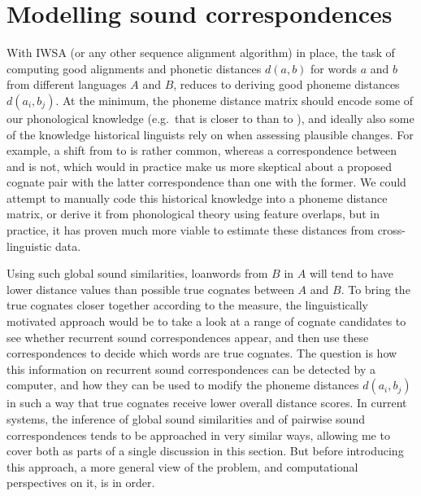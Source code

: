 \section{Modelling sound correspondences}
With IWSA (or any other sequence alignment algorithm) in place, the task of computing good alignments and phonetic distances $d(a,b)$ for words $a$ and $b$ from different languages $A$ and $B$, reduces to deriving good phoneme distances $d(a_i,b_j)$. At the minimum, the phoneme distance matrix should encode some of our phonological knowledge (e.g.\ that \ipa{[b]} is closer to \ipa{[p]} than to \ipa{[l]}), and ideally also some of the knowledge historical linguists rely on when assessing plausible changes. For example, a shift from \ipa{[s]} to \ipa{[h]} is rather common, whereas a correspondence between \ipa{[s]} and \ipa{[w]} is not, which would in practice make us more skeptical about a proposed cognate pair with the latter correspondence than one with the former. We could attempt to manually code this historical knowledge into a phoneme distance matrix, or derive it from phonological theory using feature overlaps, but in practice, it has proven much more viable to estimate these distances from cross-linguistic data.

Using such global sound similarities, loanwords from $B$ in $A$ will tend to have lower distance values than possible true cognates between $A$ and $B$. To bring the true cognates closer together according to the measure, the linguistically motivated approach would be to take a look at a range of cognate candidates to see whether recurrent sound correspondences appear, and then use these correspondences to decide which words are true cognates. The question is how this information on recurrent sound correspondences can be detected by a computer, and how they can be used to modify the phoneme distances $d(a_i,b_j)$ in such a way that true cognates receive lower overall distance scores. In current systems, the inference of global sound similarities and of pairwise sound correspondences tends to be approached in very similar ways, allowing me to cover both as parts of a single discussion in this section. But before introducing this approach, a more general view of the problem, and computational perspectives on 
it, is in order.

